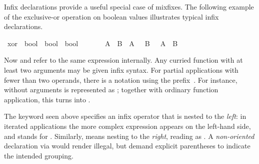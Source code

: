 \begin{isabellebody}
\begin{isamarkuptext}
  Infix declarations provide a useful special
  case of mixfixes.  The following example of the exclusive-or
  operation on boolean values illustrates typical infix declarations.%
\end{isamarkuptext}%
\isamarkuptrue%
\isamarkupfalse%
\ xor\ {\isacharcolon}{\isacharcolon}\ {\isachardoublequoteopen}bool\ {\isasymRightarrow}\ bool\ {\isasymRightarrow}\ bool{\isachardoublequoteclose}\ \ \ \ {\isacharparenleft}\ {\isachardoublequoteopen}{\isacharbrackleft}{\isacharplus}{\isacharbrackright}{\isachardoublequoteclose}\ {}{}{\isacharparenright}\isanewline
{}\ {\isachardoublequoteopen}A\ {\isacharbrackleft}{\isacharplus}{\isacharbrackright}\ B\ {\isasymequiv}\ {\isacharparenleft}A\ {\isasymand}\ {\isasymnot}\ B{\isacharparenright}\ {\isasymor}\ {\isacharparenleft}{\isasymnot}\ A\ {\isasymand}\ B{\isacharparenright}{\isachardoublequoteclose}%
\begin{isamarkuptext}%
\noindent Now  and  refer to the
  same expression internally.  Any curried function with at least two
  arguments may be given infix syntax.  For partial applications with
  fewer than two operands, there is a notation using the prefix~.  For instance,  without arguments is represented as
  ; together with ordinary function application, this
  turns  into .

  The keyword  seen above specifies an
  infix operator that is nested to the \emph{left}: in iterated
  applications the more complex expression appears on the left-hand
  side, and  stands for .  Similarly,  means nesting to the
  \emph{right}, reading  as .  A \emph{non-oriented} declaration via 
  would render  illegal, but demand explicit
  parentheses to indicate the intended grouping.


\end{isamarkuptext}
\end{isabellebody}
